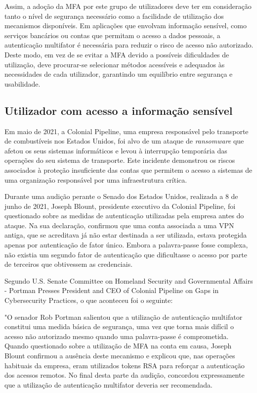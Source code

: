 \hspace{1cm} Assim, a adoção da MFA por este grupo de utilizadores deve ter em consideração tanto o nível de segurança necessário como a facilidade de utilização dos mecanismos disponíveis. Em aplicações que envolvam informação sensível, como serviços bancários ou contas que permitam o acesso a dados pessoais, a autenticação multifator é necessária para reduzir o risco de acesso não autorizado. Deste modo, em vez de se evitar a MFA devido a possíveis dificuldades de utilização, deve procurar-se selecionar métodos acessíveis e adequados às necessidades de cada utilizador, garantindo um equilíbrio entre segurança e usabilidade.

\subsection{Utilizador com acesso a informação sensível}

\hspace{1cm} Em maio de 2021, a Colonial Pipeline, uma empresa responsável pelo transporte de combustíveis nos Estados Unidos, foi alvo de um ataque de \textit{ransomware} que afetou os seus sistemas informáticos e levou à interrupção temporária das operações do seu sistema de transporte. Este incidente demonstrou os riscos associados à proteção insuficiente das contas que permitem o acesso a sistemas de uma organização responsável por uma infraestrutura crítica.

\hspace{1cm} Durante uma audição perante o Senado dos Estados Unidos, realizada a 8 de junho de 2021, Joseph Blount, presidente executivo da Colonial Pipeline, foi questionado sobre as medidas de autenticação utilizadas pela empresa antes do ataque. Na sua declaração, confirmou que uma conta associada a uma VPN antiga, que se acreditava já não estar destinada a ser utilizada, estava protegida apenas por autenticação de fator único. Embora a palavra-passe fosse complexa, não existia um segundo fator de autenticação que dificultasse o acesso por parte de terceiros que obtivessem as credenciais.

\hspace{1cm} Segundo U.S. Senate Committee on Homeland Security and Governmental Affairs - Portman Presses President and CEO of Colonial Pipeline on Gaps in Cybersecurity Practices, o que aconteceu foi o seguinte:

\hspace{1cm} "O senador Rob Portman salientou que a utilização de autenticação multifator constitui uma medida básica de segurança, uma vez que torna mais difícil o acesso não autorizado mesmo quando uma palavra-passe é comprometida. Quando questionado sobre a utilização de MFA na conta em causa, Joseph Blount confirmou a ausência deste mecanismo e explicou que, nas operações habituais da empresa, eram utilizados tokens RSA para reforçar a autenticação dos acessos remotos. No final desta parte da audição, concordou expressamente que a utilização de autenticação multifator deveria ser recomendada.

